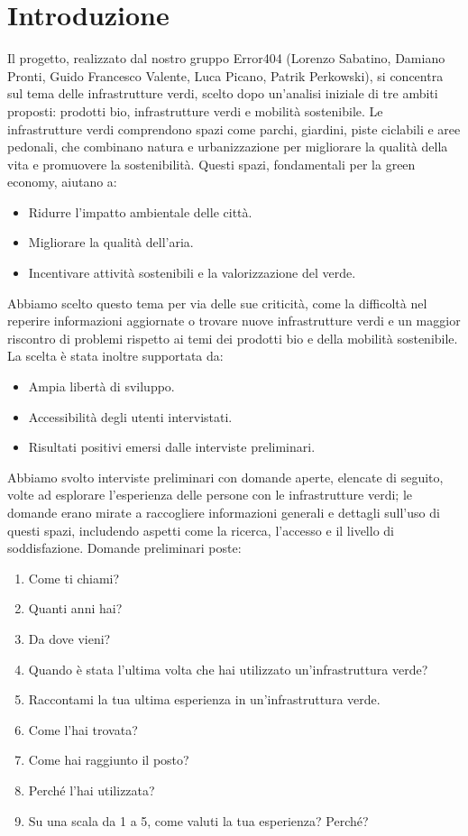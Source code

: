 \setcounter{page}{1}
\chapter{Introduzione}

Il progetto, realizzato dal nostro gruppo Error404 (Lorenzo Sabatino, Damiano Pronti, Guido Francesco Valente, Luca Picano, Patrik Perkowski), si concentra sul tema delle infrastrutture verdi, scelto dopo un’analisi iniziale di tre ambiti proposti: prodotti bio, infrastrutture verdi e mobilità sostenibile.
Le infrastrutture verdi comprendono spazi come parchi, giardini, piste ciclabili e aree pedonali, che combinano natura e urbanizzazione per migliorare la qualità della vita e promuovere la sostenibilità. Questi spazi, fondamentali per la green economy, aiutano a:
\begin{itemize}
    \item Ridurre l’impatto ambientale delle città.
    \item Migliorare la qualità dell’aria.
    \item Incentivare attività sostenibili e la valorizzazione del verde.
\end{itemize}
Abbiamo scelto questo tema per via delle sue criticità, come la difficoltà nel reperire informazioni aggiornate o trovare nuove infrastrutture verdi e un maggior riscontro di problemi rispetto ai temi dei prodotti bio e della mobilità sostenibile. La scelta è stata inoltre   supportata da:
\begin{itemize}
    \item Ampia libertà di sviluppo.
    \item Accessibilità degli utenti intervistati.
    \item Risultati positivi emersi dalle interviste preliminari.
\end{itemize}
Abbiamo svolto interviste preliminari con domande aperte, elencate di seguito, volte ad esplorare l’esperienza delle persone con le infrastrutture verdi; le domande erano mirate a raccogliere informazioni generali e dettagli sull’uso di questi spazi, includendo aspetti come la ricerca, l’accesso e il livello di soddisfazione.
Domande preliminari poste:
\begin{enumerate}
    \item Come ti chiami?
    \item Quanti anni hai?
    \item Da dove vieni?
    \item Quando è stata l’ultima volta che hai utilizzato un’infrastruttura verde?
    \item Raccontami la tua ultima esperienza in un’infrastruttura verde.
    \item Come l’hai trovata?
    \item Come hai raggiunto il posto?
    \item Perché l’hai utilizzata?
    \item Su una scala da 1 a 5, come valuti la tua esperienza? Perché?
\end{enumerate}
